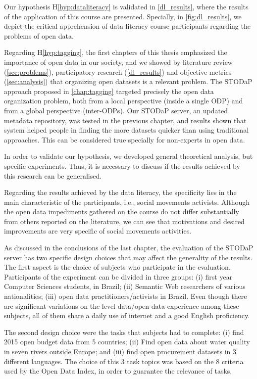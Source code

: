 Our hypothesis H\ref{hyp:dataliteracy} is validated in \autoref{dl_results}, where the results of the application of this course are presented.
Specially, in \autoref{fig:dl_results}, we depict the critical apprehension of data literacy course participants regarding the problems of open data.

Regarding H\ref{hyp:tagging}, the first chapters of this thesis emphasized the importance of open data in our society, and we showed by literature review (\autoref{sec:problems}), participatory research (\autoref{dl_results}) and objective metrics (\autoref{sec:analysis}) that organizing open datasets is a relevant problem.
The STODaP approach proposed in \autoref{chap:tagging} targeted precisely the open data organization problem, both from a local perspective (inside a single ODP) and from a global perspective (inter-ODPs).
Our STODaP server, an updated metadata repository, was tested in the previous chapter, and results shown that system helped people in finding the more datasets quicker than using traditional approaches.
This can be considered true specially for non-experts in open data.

In order to validate our hypothesis, we developed general theoretical analysis, but specific experiments.
Thus, it is necessary to discuss if the results achieved by this research can be generalised.

Regarding the results achieved by the data literacy, the specificity lies in the main characteristic of the participants, i.e., social movements activists.
Although the open data impediments gathered on the course do not differ substantially from others reported on the literature, we can see that motivations and desired improvements are very specific of social movements activities.

As discussed in the conclusions of the last chapter, the evaluation of the STODaP server has two specific design choices that may affect the generality of the results.
The first aspect is the choice of subjects who participate in the evaluation.
Participants of the experiment can be divided in three groups: (i) first year Computer Sciences students, in Brazil; (ii) Semantic Web researchers of various nationalities; (iii) open data practitioners/activists in Brazil.
Even though there are significant variations on the level data/open data experience among these subjects, all of them share a daily use of internet and a good English proficiency.

The second design choice were the tasks that subjects had to complete: (i) find 2015 open budget data from 5 countries; (ii) Find open data about water quality in seven rivers outside Europe; and (iii) find open procurement datasets in 3 different languages.
The choice of this 3 task topics was based on the 8 criteria used by the Open Data Index, in order to guarantee the relevance of tasks.

